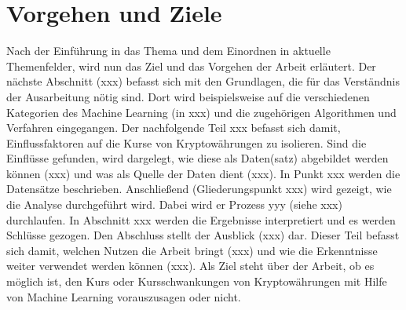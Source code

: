 \chapter{Vorgehen und Ziele}\label{chapter:Vorgehen}
Nach der Einführung in das Thema und dem Einordnen in aktuelle Themenfelder, wird nun das Ziel und das Vorgehen der Arbeit erläutert.\newline
Der nächste Abschnitt (xxx) befasst sich mit den Grundlagen, die für das Verständnis der Ausarbeitung nötig sind. Dort wird beispielsweise auf die verschiedenen Kategorien des Machine Learning (in xxx) und die zugehörigen Algorithmen und Verfahren eingegangen. Der nachfolgende Teil xxx befasst sich damit, Einflussfaktoren auf die Kurse von Kryptowährungen zu isolieren. Sind die Einflüsse gefunden, wird dargelegt, wie diese als Daten(satz) abgebildet werden können (xxx) und was als Quelle der Daten dient (xxx). In Punkt xxx werden die Datensätze beschrieben. Anschließend (Gliederungspunkt xxx) wird gezeigt, wie die Analyse durchgeführt wird. Dabei wird er Prozess yyy (siehe xxx)  durchlaufen. In Abschnitt xxx werden die Ergebnisse interpretiert und es werden Schlüsse gezogen.  Den Abschluss stellt der Ausblick (xxx) dar. Dieser Teil befasst sich damit, welchen Nutzen die Arbeit bringt (xxx) und wie die Erkenntnisse weiter verwendet werden können (xxx).\newline
{}
Als Ziel steht über der Arbeit, ob es möglich ist, den Kurs oder Kursschwankungen von Kryptowährungen mit Hilfe von Machine Learning vorauszusagen oder nicht. 
